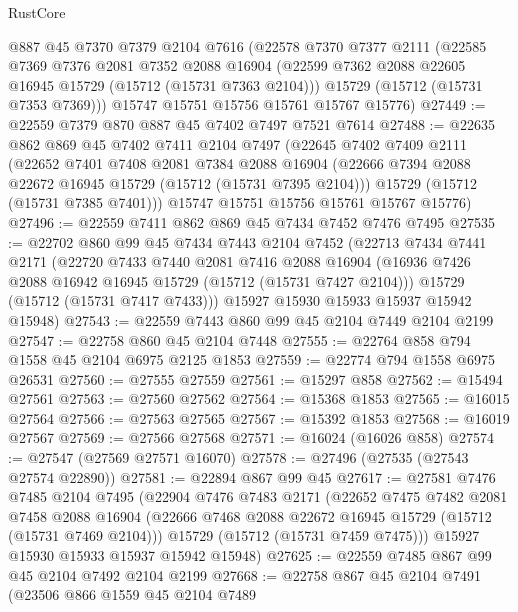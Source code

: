 \begin{lexlean}{RustCore}
\begin{coremodule}
    @887
    @45
    @7370
    @7379
    @2104
    @7616
    (@22578
      @7370
      @7377
      @2111
      (@22585
        @7369
        @7376
        @2081
        @7352
        @2088
        @16904
        (@22599 @7362 @2088 @22605 @16945 @15729 (@15712 (@15731 @7363 @2104)))
        @15729
        (@15712 (@15731 @7353 @7369)))
      @15747
      @15751
      @15756
      @15761
      @15767
      @15776)
@27449 := @22559 @7379 @870 @887 @45 @7402 @7497 @7521 @7614
@27488 := @22635
    @862
    @869
    @45
    @7402
    @7411
    @2104
    @7497
    (@22645
      @7402
      @7409
      @2111
      (@22652
        @7401
        @7408
        @2081
        @7384
        @2088
        @16904
        (@22666 @7394 @2088 @22672 @16945 @15729 (@15712 (@15731 @7395 @2104)))
        @15729
        (@15712 (@15731 @7385 @7401)))
      @15747
      @15751
      @15756
      @15761
      @15767
      @15776)
@27496 := @22559 @7411 @862 @869 @45 @7434 @7452 @7476 @7495
@27535 := @22702
    @860
    @99
    @45
    @7434
    @7443
    @2104
    @7452
    (@22713
      @7434
      @7441
      @2171
      (@22720
        @7433
        @7440
        @2081
        @7416
        @2088
        @16904
        (@16936 @7426 @2088 @16942 @16945 @15729 (@15712 (@15731 @7427 @2104)))
        @15729
        (@15712 (@15731 @7417 @7433)))
      @15927
      @15930
      @15933
      @15937
      @15942
      @15948)
@27543 := @22559 @7443 @860 @99 @45 @2104 @7449 @2104 @2199
@27547 := @22758 @860 @45 @2104 @7448
@27555 := @22764 @858 @794 @1558 @45 @2104 @6975 @2125 @1853
@27559 := @22774 @794 @1558 @6975 @26531
@27560 := @27555 @27559
@27561 := @15297 @858
@27562 := @15494 @27561
@27563 := @27560 @27562
@27564 := @15368 @1853
@27565 := @16015 @27564
@27566 := @27563 @27565
@27567 := @15392 @1853
@27568 := @16019 @27567
@27569 := @27566 @27568
@27571 := @16024 (@16026 @858)
@27574 := @27547 (@27569 @27571 @16070)
@27578 := @27496 (@27535 (@27543 @27574 @22890))
@27581 := @22894 @867 @99 @45
@27617 := @27581
    @7476
    @7485
    @2104
    @7495
    (@22904
      @7476
      @7483
      @2171
      (@22652
        @7475
        @7482
        @2081
        @7458
        @2088
        @16904
        (@22666 @7468 @2088 @22672 @16945 @15729 (@15712 (@15731 @7469 @2104)))
        @15729
        (@15712 (@15731 @7459 @7475)))
      @15927
      @15930
      @15933
      @15937
      @15942
      @15948)
@27625 := @22559 @7485 @867 @99 @45 @2104 @7492 @2104 @2199
@27668 := @22758
    @867
    @45
    @2104
    @7491
    (@23506
      @866
      @1559
      @45
      @2104
      @7489

\end{coremodule}
\end{lexlean}
